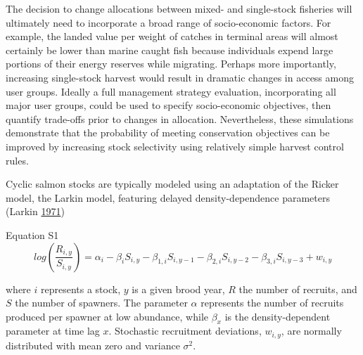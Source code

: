 \documentclass[11pt]{book}
\begin{document}
The decision to change allocations between mixed- and single-stock fisheries will ultimately need to incorporate a broad range of socio-economic factors. For example, the landed value per weight of catches in terminal areas will almost certainly be lower than marine caught fish because individuals expend large portions of their energy reserves while migrating. Perhaps more importantly, increasing single-stock harvest would result in dramatic changes in access among user groups. Ideally a full management strategy evaluation, incorporating all major user groups, could be used to specify socio-economic objectives, then quantify trade-offs prior to changes in allocation. Nevertheless, these simulations demonstrate that the probability of meeting conservation objectives can be improved by increasing stock selectivity using relatively simple harvest control rules.

\Appendices

\clearpage


\label{app:appendixS1}

\label{larkin-model}

Cyclic salmon stocks are typically modeled using an adaptation of the Ricker model, the Larkin model, featuring delayed density-dependence parameters (Larkin \protect\hyperlink{ref-Larkin1971}{1971})

Equation S1 \[log(\frac{R_{i,y}}{S_{i,y}}) = \alpha_i - \beta_iS_{i,y} - \beta_{1,i}S_{i,y-1} - \beta_{2,i}S_{i,y-2} - \beta_{3,i}S_{i,y-3} + w_{i,y}\]

where \(i\) represents a stock, \(y\) is a given brood year, \(R\) the number of recruits, and \(S\) the number of spawners. The parameter \(\alpha\) represents the number of recruits produced per spawner at low abundance, while \(\beta_{x}\) is the density-dependent parameter at time lag \(x\). Stochastic recruitment deviations, \(w_{i,y}\), are normally distributed with mean zero and variance \(\sigma^2\).

\label{recursive-bayes-stock-recruit-model}

\label{harvest-control-rules}
\end{document}
